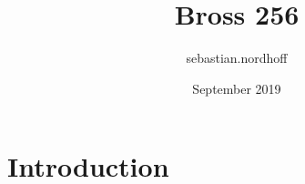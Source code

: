 \documentclass{article}
\title{Bross 256}
\author{sebastian.nordhoff }
\date{September 2019}
\begin{document}
\maketitle

\section{Introduction}
\end{document}
